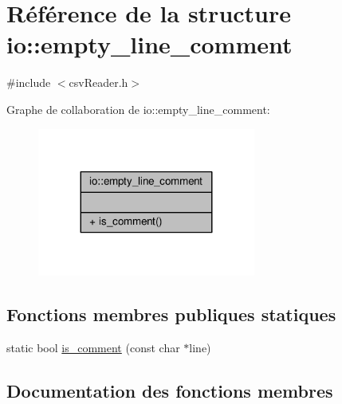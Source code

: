 \hypertarget{structio_1_1empty__line__comment}{}\section{Référence de la structure io\+:\+:empty\+\_\+line\+\_\+comment}
\label{structio_1_1empty__line__comment}


{\ttfamily \#include $<$csv\+Reader.\+h$>$}



Graphe de collaboration de io\+:\+:empty\+\_\+line\+\_\+comment\+:
\nopagebreak
\begin{figure}[H]
\begin{center}
\leavevmode
\includegraphics[width=203pt]{structio_1_1empty__line__comment__coll__graph}
\end{center}
\end{figure}
\subsection*{Fonctions membres publiques statiques}
\begin{DoxyCompactItemize}
\item 
static bool \hyperlink{structio_1_1empty__line__comment_a88e2cee044a9aafabf3e2a0e64fa5289}{is\+\_\+comment} (const char $\ast$line)
\end{DoxyCompactItemize}


\subsection{Documentation des fonctions membres}
\mbox{\label{structio_1_1empty__line__comment_a88e2cee044a9aafabf3e2a0e64fa5289}} 
